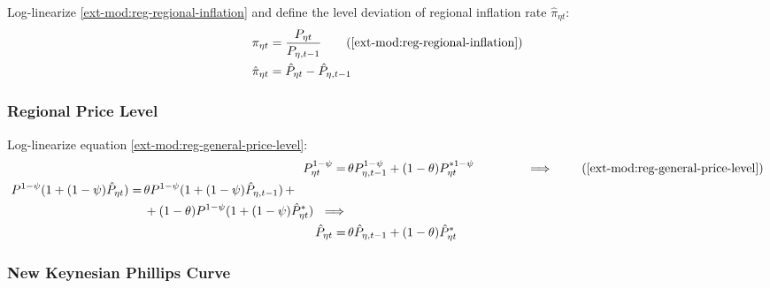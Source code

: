 \documentclass[../thesis.tex]{subfiles}
\begin{document}
Log-linearize \ref{ext-mod:reg-regional-inflation} and define the level deviation of regional inflation rate $\hat{\pi}_{\eta t}$:
\begin{align}
	\pi_{\eta t} &= \frac{P_{\eta t}}{P_{\eta, t-1}} \tag{\ref{ext-mod:reg-regional-inflation}} \\
	\hat{\pi}_{\eta t} &= \hat{P}_{\eta t} - \hat{P}_{\eta, t-1}
	\label{ext-mod:level-dev-regional-inflation}
\end{align}


\subsubsection*{Regional Price Level}

Log-linearize equation \ref{ext-mod:reg-general-price-level}:
\begin{align}
	P_{\eta t}^{1-\psi} =\, &\theta P_{\eta, t-1}^{1-\psi} + (1-\theta) P_{\eta t}^{\ast 1-\psi} \qquad \qquad \implies \tag{\ref{ext-mod:reg-general-price-level}} \\
	\begin{split} P^{1-\psi} (1 + (1-\psi)\hat{P}_{\eta t}) =\, &\theta P^{1-\psi} (1 + (1-\psi)\hat{P}_{\eta, t-1}) \, + \\ & + (1-\theta) P^{1-\psi} (1 + (1-\psi)\hat{P}_{\eta t}^{\ast}) \ \implies \nonumber \end{split} \\
	\hat{P}_{\eta t} =\, &\theta \hat{P}_{\eta, t-1} + (1-\theta) \hat{P}_{\eta t}^{\ast}
	\label{ext-mod:reg-ll-general-price-level}
\end{align}


\subsubsection*{New Keynesian Phillips Curve}
\end{document}
